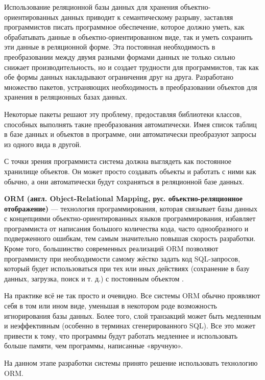 Использование реляционной базы данных для хранения объектно-ориентированных данных приводит к семантическому разрыву, заставляя программистов писать программное обеспечение, которое должно уметь, как обрабатывать данные в объектно-ориентированном виде, так и уметь сохранить эти данные в реляционной форме. Эта постоянная необходимость в преобразовании между двумя разными формами данных не только сильно снижает производительность, но и создает трудности для программистов, так как обе формы данных накладывают ограничения друг на друга.
Разработано множество пакетов, устраняющих необходимость в преобразовании объектов для хранения в реляционных базах данных.

Некоторые пакеты решают эту проблему, предоставляя библиотеки классов, способных выполнять такие преобразования автоматически. Имея список таблиц в базе данных и объектов в программе, они автоматически преобразуют запросы из одного вида в другой.

С точки зрения программиста система должна выглядеть как постоянное хранилище объектов. Он может просто создавать объекты и работать с ними как обычно, а они автоматически будут сохраняться в реляционной базе данных.

\textbf{ORM (англ. Object-Relational Mapping, рус. объектно-реляционное отображение)} — технология программирования, которая связывает базы данных с концепциями объектно-ориентированных языков программирования, избавляет программиста от написания большого количества кода, часто однообразного и подверженного ошибкам, тем самым значительно повышая скорость разработки. Кроме того, большинство современных реализаций ORM позволяют программисту при необходимости самому жёстко задать код SQL-запросов, который будет использоваться при тех или иных действиях (сохранение в базу данных, загрузка, поиск и т. д.) с постоянным объектом \cite{wiki-orm}.

На практике всё не так просто и очевидно. Все системы ORM обычно проявляют себя в том или ином виде, уменьшая в некотором роде возможность игнорирования базы данных. Более того, слой транзакций может быть медленным и неэффективным (особенно в терминах сгенерированного SQL). Все это может привести к тому, что программы будут работать медленнее и использовать больше памяти, чем программы, написанные «вручную».

На данном этапе разработки системы принято решение использовать технологию ORM.


